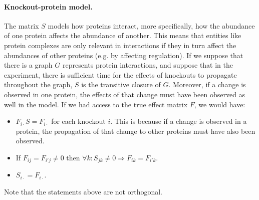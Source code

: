 \documentclass{article}
\begin{document}
\paragraph{Knockout-protein model.}
The matrix $S$ models how proteins interact, more specifically, how the abundance of one protein affects the abundance of another.
This means that entities like protein complexes are only relevant in interactions if they in turn affect the abundances of other proteins (e.g. by affecting regulation).
If we suppose that there is a graph $G$ represents protein interactions, and suppose that in the experiment, there is sufficient time for the effects of knockouts to propagate throughout the graph, $S$ is the transitive closure of $G$.
Moreover, if a change is observed in one protein, the effects of that change must have been observed as well in the model.
If we had access to the true effect matrix $F$, we would have:
\begin{itemize}
 \item $F_{i \cdot} S = F_{i \cdot}$ for each knockout $i$. This is because if a change is observed in a protein, the propagation of that change to other proteins must have also been observed.
 \item If $F_{i j} = F_{i' j} \neq 0$ then $\forall k : S_{j k} \neq 0 \Rightarrow F_{i k} = F_{i' k}$.
 \item $S_{i \cdot} = F_{i \cdot}$.
\end{itemize}
Note that the statements above are not orthogonal.
\end{document}
